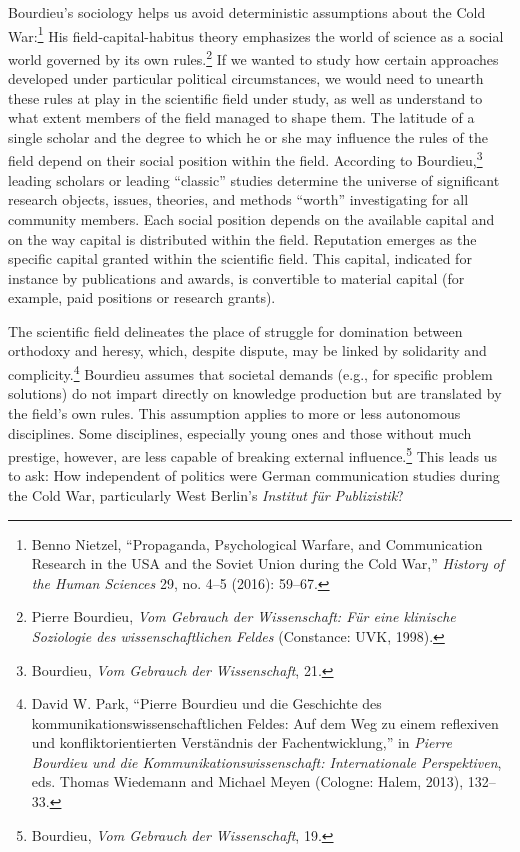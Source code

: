 \documentclass{tufte-handout}
\begin{document}
Bourdieu's sociology helps us avoid deterministic assumptions about the
Cold War:\footnote{Benno Nietzel, ``Propaganda, Psychological Warfare,
  and Communication Research in the USA and the Soviet Union during the
  Cold War,'' \emph{History of the Human Sciences} 29, no. 4--5 (2016):
  59--67.} His field-capital-habitus theory emphasizes the world of
science as a social world governed by its own rules.\footnote{Pierre
  Bourdieu, \emph{Vom Gebrauch der Wissenschaft: Für eine klinische
  Soziologie des wissenschaftlichen Feldes} (Constance: UVK, 1998).} If
we wanted to study how certain approaches developed under particular
political circumstances, we would need to unearth these rules at play in
the scientific field under study, as well as understand to what extent
members of the field managed to shape them. The latitude of a single
scholar and the degree to which he or she may influence the rules of the
field depend on their social position within the field. According to
Bourdieu,\footnote{Bourdieu, \emph{Vom Gebrauch der Wissenschaft}, 21.}
leading scholars or leading ``classic'' studies determine the universe
of significant research objects, issues, theories, and methods ``worth''
investigating for all community members. Each social position depends on
the available capital and on the way capital is distributed within the
field. Reputation emerges as the specific capital granted within the
scientific field. This capital, indicated for instance by publications
and awards, is convertible to material capital (for example, paid
positions or research grants).

The scientific field delineates the place of struggle for domination
between orthodoxy and heresy, which, despite dispute, may be linked by
solidarity and complicity.\footnote{David W. Park, ``Pierre Bourdieu und
  die Geschichte des kommunikationswissenschaftlichen Feldes: Auf dem
  Weg zu einem reflexiven und konfliktorientierten Verständnis der
  Fachentwicklung,'' in \emph{Pierre Bourdieu und die
  Kommunikationswissenschaft: Internationale Perspektiven}, eds. Thomas
  Wiedemann and Michael Meyen (Cologne: Halem, 2013), 132--33.} Bourdieu
assumes that societal demands (e.g., for specific problem solutions) do
not impart directly on knowledge production but are translated by the
field's own rules. This assumption applies to more or less autonomous
disciplines. Some disciplines, especially young ones and those without
much prestige, however, are less capable of breaking external
influence.\footnote{Bourdieu, \emph{Vom Gebrauch der Wissenschaft}, 19.}
This leads us to ask: How independent of politics were German
communication studies during the Cold War, particularly West Berlin's
\emph{Institut für Publizistik}?
\end{document}

